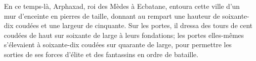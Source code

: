 En ce temps-là, Arphaxad, roi des Mèdes à Ecbatane,
	entoura cette ville d'un mur d'enceinte en pierres de taille,
	donnant au rempart une hauteur de soixante-dix coudées et une largeur de cinquante.
Sur les portes, il dressa des tours
	de cent coudées de haut sur soixante de large à leurs fondations;
	les portes elles-mêmes s'élevaient à soixante-dix coudées sur quarante de large,
	pour permettre les sorties de ses forces d'élite
		et des fantassins en ordre de bataille.
